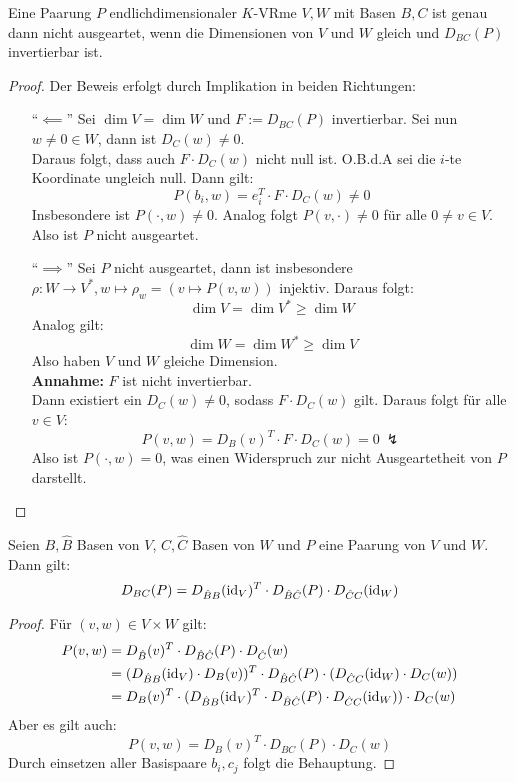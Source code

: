 \documentclass[parskip,a4paper,twoside,DIV15,BCOR12mm]{scrbook}
\begin{document}
\begin{theo}
\label{Satz 15.2}
Eine Paarung $P$ endlichdimensionaler $K$-VRme $V,W$ mit Basen $B,C$ ist genau dann
nicht ausgeartet, wenn die Dimensionen von $V$ und $W$ gleich und $D_{BC}(P)$ invertierbar
ist.
\end{theo}

\begin{proof}
Der Beweis erfolgt durch Implikation in beiden Richtungen:
\begin{enumerate}
\item["`$\impliedby$"'] Sei $\dim V=\dim W$ und $F:=D_{BC}(P)$ invertierbar.
Sei nun $w\ne 0\in W$, dann ist $D_C(w)\ne 0$.\\
Daraus folgt, dass auch $F\cdot D_C(w)$ nicht null ist. O.B.d.A sei die
$i$-te Koordinate ungleich null. Dann gilt:
\[P(b_i,w)=e_i^T\cdot F\cdot D_C(w)\ne 0\]
Insbesondere ist $P(\cdot,w)\ne 0$.
Analog folgt $P(v,\cdot)\ne 0$ für alle $0\ne v\in V$. Also ist $P$ nicht ausgeartet.
\item["`$\implies$"'] Sei $P$ nicht ausgeartet, dann ist insbesondere $\rho:W\to V^*,
w\mapsto \rho_w=(v\mapsto P(v,w))$ injektiv. Daraus folgt:
\[\dim V=\dim V^*\ge \dim W\]
Analog gilt:
\[\dim W=\dim W^*\ge \dim V\]
Also haben $V$ und $W$ gleiche Dimension.\\
\textbf{Annahme:} $F$ ist nicht invertierbar.\\
Dann existiert ein $D_C(w)\ne 0$, sodass $F\cdot D_C(w)$ gilt. Daraus folgt
für alle $v\in V$:
\[P(v,w)=D_B(v)^T\cdot F\cdot D_C(w)=0\ \lightning\]
Also ist $P(\cdot,w)=0$, was einen Widerspruch zur nicht Ausgeartetheit von $P$ darstellt.
\end{enumerate}
\end{proof}

\begin{theo}
\label{Satz 15.3}
Seien $B,\hat B$ Basen von $V$, $C,\hat C$ Basen von $W$ und $P$ eine Paarung von
$V$ und $W$. Dann gilt:
\[D_{BC}(P)=D_{\hat BB}(\operatorname{id}_V)^T\cdot D_{\hat B\hat C}(P)\cdot D_{\hat CC}(\operatorname{id}_W)\]
\end{theo}

\begin{proof}
Für $(v,w)\in V\times W$ gilt:
\begin{align*}
P(v,w)&=D_{\hat B}(v)^T\cdot D_{\hat B\hat C}(P)\cdot D_{\hat C}(w)\\
&=(D_{\hat BB}(\operatorname{id}_V)\cdot D_B(v))^T\cdot D_{\hat B\hat C}(P)\cdot(D_{\hat CC}(\operatorname{id}_W)\cdot D_C(w))\\
&=D_B(v)^T \cdot (D_{\hat BB}(\operatorname{id}_V)^T \cdot D_{\hat B\hat C}(P)\cdot D_{\hat CC}(\operatorname{id}_W))\cdot D_C(w)
\end{align*}
Aber es gilt auch:
\[P(v,w)=D_B(v)^T\cdot D_{BC}(P)\cdot D_C(w)\]
Durch einsetzen aller Basispaare $b_i,c_j$ folgt die Behauptung.
\end{proof}
\end{document}
